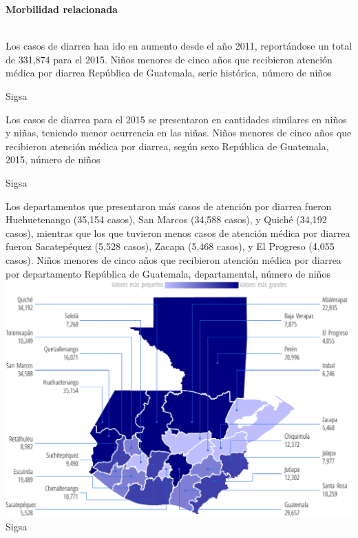 
\begin{center}
	\textbf{\color{color2}\LARGE \thesection} \quad  \textbf{\LARGE Morbilidad relacionada} 
\end{center}
$\ $ \\[-2.3cm]
%
{%
	Los casos de diarrea han ido en aumento desde el año 2011, reportándose un total de 331,874 para el 2015.
}%
{%
	Niños menores de cinco años que recibieron atención médica por diarrea} %
{%
	República de Guatemala, serie histórica, número de niños} %
{%
	\begin{tikzpicture}[x=1pt,y=1pt]    \end{tikzpicture}}%
{%
	Sigsa} %



%
{%
	Los casos de diarrea para el 2015 se presentaron en cantidades similares en niños y niñas, teniendo menor ocurrencia en las niñas. 
	}%
{%
	Niños menores de cinco años que recibieron atención médica por diarrea, según sexo} %
{%
	República de Guatemala, 2015, número de niños} %
{%
	\begin{tikzpicture}[x=1pt,y=1pt]    \end{tikzpicture}}%
{%
	Sigsa} %



%
{%
	Los departamentos que presentaron más casos de atención por diarrea fueron Huehuetenango (35,154 casos), San Marcos (34,588 casos), y Quiché (34,192 casos), mientras que los que tuvieron menos casos de atención médica por diarrea fueron Sacatepéquez (5,528 casos), Zacapa (5,468 casos), y El Progreso (4,055 casos). 
}%
{%
	Niños menores de cinco años que recibieron atención médica por diarrea por departamento} %
{%
	República de Guatemala, departamental, número de niños} %
{%
	\includegraphics[width=52\cuadri]{graficas/5_14.pdf}}%
{%
	Sigsa} %


